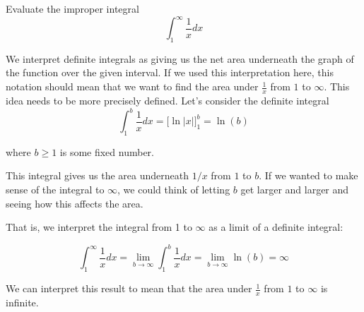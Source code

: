 \documentclass{ximera}
\begin{document}
\begin{example}
Evaluate the improper integral
\[ 
\int_{1}^{\infty} \frac{1}{x} dx
\]
\begin{explanation}

We interpret definite integrals as giving us the net area underneath the graph of the function over the given interval. If we used this interpretation here, this notation should mean that we want to find the area under $\frac{1}{x}$ from $1$ to $\infty$.  This idea needs to be more precisely defined.  Let's consider the definite integral
\[
\int_{1}^{b} \frac{1}{x} dx=\bigg[\ln|x|\bigg]_{1}^{b}=\ln(b)
\]

where $b \geq 1$ is some fixed number. 

\begin{image}
\end{image}


 This integral gives us the area underneath $1/x$ from $1$ to $b$. If we wanted to make sense of the integral to $\infty$, we could think of letting $b$ 
get larger and larger and seeing how this affects the area. 

That is, we interpret the integral from 1 to $\infty$ as a limit of a definite integral:

\[
\int_{1}^{\infty} \frac{1}{x} dx= \lim_{b \to \infty} \int_{1}^{b} \frac{1}{x} dx= \lim_{b \to \infty} \ln(b) = \infty
\]

We can interpret this result to mean that the area under $\frac{1}{x}$ from $1$ to $\infty$ is infinite.
\end{explanation}
\end{example}
\end{document}
